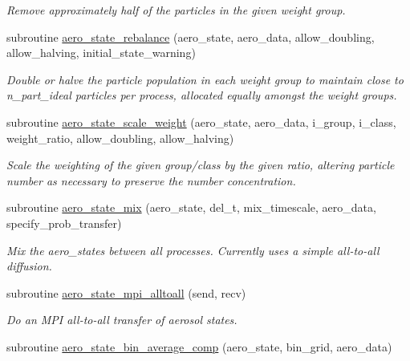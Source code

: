 \begin{DoxyCompactItemize}
\begin{DoxyCompactList}\small\item\em Remove approximately half of the particles in the given weight group. \end{DoxyCompactList}\item 
subroutine \mbox{\hyperlink{namespacepmc__aero__state_a166b2bd2407e5342dd3c5a45b0ba421e}{aero\+\_\+state\+\_\+rebalance}} (aero\+\_\+state, aero\+\_\+data, allow\+\_\+doubling, allow\+\_\+halving, initial\+\_\+state\+\_\+warning)
\begin{DoxyCompactList}\small\item\em Double or halve the particle population in each weight group to maintain close to {\ttfamily n\+\_\+part\+\_\+ideal} particles per process, allocated equally amongst the weight groups. \end{DoxyCompactList}\item 
subroutine \mbox{\hyperlink{namespacepmc__aero__state_ac4ca03b5c8c9684e8442edc2df12a020}{aero\+\_\+state\+\_\+scale\+\_\+weight}} (aero\+\_\+state, aero\+\_\+data, i\+\_\+group, i\+\_\+class, weight\+\_\+ratio, allow\+\_\+doubling, allow\+\_\+halving)
\begin{DoxyCompactList}\small\item\em Scale the weighting of the given group/class by the given ratio, altering particle number as necessary to preserve the number concentration. \end{DoxyCompactList}\item 
subroutine \mbox{\hyperlink{namespacepmc__aero__state_a3c40aa98c11c8dfe6e662f2bbd8672e9}{aero\+\_\+state\+\_\+mix}} (aero\+\_\+state, del\+\_\+t, mix\+\_\+timescale, aero\+\_\+data, specify\+\_\+prob\+\_\+transfer)
\begin{DoxyCompactList}\small\item\em Mix the aero\+\_\+states between all processes. Currently uses a simple all-\/to-\/all diffusion. \end{DoxyCompactList}\item 
subroutine \mbox{\hyperlink{namespacepmc__aero__state_ae546d85939653c1b2c7d52121d5f2bc6}{aero\+\_\+state\+\_\+mpi\+\_\+alltoall}} (send, recv)
\begin{DoxyCompactList}\small\item\em Do an M\+PI all-\/to-\/all transfer of aerosol states. \end{DoxyCompactList}\item 
subroutine \mbox{\hyperlink{namespacepmc__aero__state_ab056de58c6dda08da7f81ef695326c89}{aero\+\_\+state\+\_\+bin\+\_\+average\+\_\+comp}} (aero\+\_\+state, bin\+\_\+grid, aero\+\_\+data)

\end{DoxyCompactItemize}
